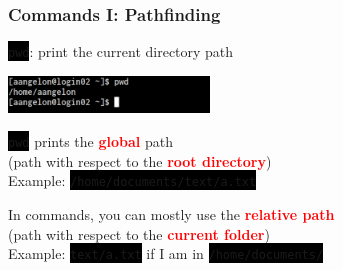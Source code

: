 \documentclass[unknownkeysallowed, 10pt, a4 paper, handout]{beamer}
\newcommand{\focus}[1]{\textbf{\textcolor{red}{#1}}}
\newcommand{\code}[1]{\colorbox{black}{\color{green}\texttt{#1}}}
\begin{document}
\begin{frame}[c]
  \begin{center}
    \frametitle{Commands I: Pathfinding}
    \code{pwd}: print the current directory path
    \vspace{-4mm}

    \begin{center}
      \includegraphics[width=0.40\textwidth]{pics/pwd.png}
    \end{center}
    \vspace{4mm}

    \code{pwd} prints the \focus{global} path\\
    (path with respect to the \focus{root directory})\\
    Example: \code{/home/documents/text/a.txt}
    \vspace{4mm}

    In commands, you can mostly use the \focus{relative path}\\
    (path with respect to the \focus{current folder})\\
    Example: \code{text/a.txt} if I am in \code{/home/documents/}
  \end{center}
\end{frame}
\end{document}
